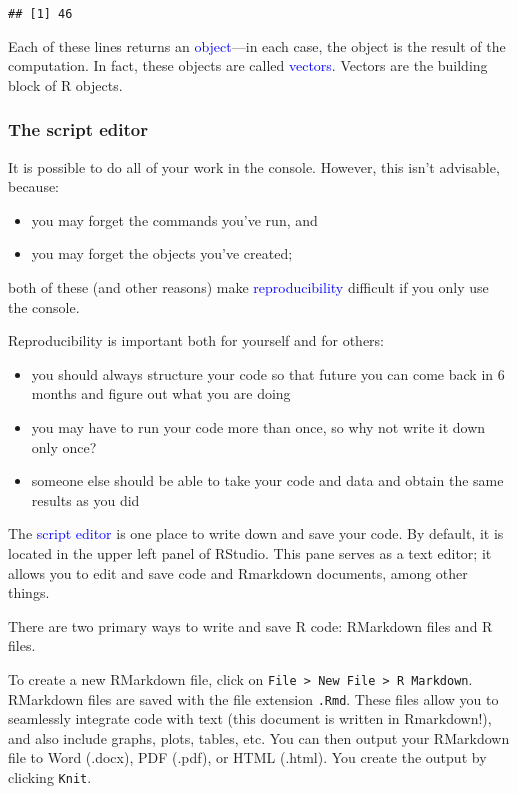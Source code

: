 \documentclass[
]{article}
\providecommand{\tightlist}{%
  \setlength{\itemsep}{0pt}\setlength{\parskip}{0pt}}
\begin{document}
\begin{verbatim}
## [1] 46
\end{verbatim}

Each of these lines returns an \textcolor{blue}{object}---in each case,
the object is the result of the computation. In fact, these objects are
called \textcolor{blue}{vectors}. Vectors are the building block of R
objects.

\hypertarget{the-script-editor}{%
\subsubsection{The script editor}\label{the-script-editor}}

It is possible to do all of your work in the console. However, this
isn't advisable, because:

\begin{itemize}
\tightlist
\item
  you may forget the commands you've run, and
\item
  you may forget the objects you've created;
\end{itemize}

both of these (and other reasons) make \textcolor{blue}{reproducibility}
difficult if you only use the console.

Reproducibility is important both for yourself and for others:

\begin{itemize}
\tightlist
\item
  you should always structure your code so that future you can come back
  in 6 months and figure out what you are doing
\item
  you may have to run your code more than once, so why not write it down
  only once?
\item
  someone else should be able to take your code and data and obtain the
  same results as you did
\end{itemize}

The \textcolor{blue}{script editor} is one place to write down and save
your code. By default, it is located in the upper left panel of RStudio.
This pane serves as a text editor; it allows you to edit and save code
and Rmarkdown documents, among other things.

There are two primary ways to write and save R code: RMarkdown files and
R files.

To create a new RMarkdown file, click on
\texttt{File\ \textgreater{}\ New\ File\ \textgreater{}\ R\ Markdown}.
RMarkdown files are saved with the file extension \texttt{.Rmd}. These
files allow you to seamlessly integrate code with text (this document is
written in Rmarkdown!), and also include graphs, plots, tables, etc. You
can then output your RMarkdown file to Word (.docx), PDF (.pdf), or HTML
(.html). You create the output by clicking \texttt{Knit}.
\end{document}
